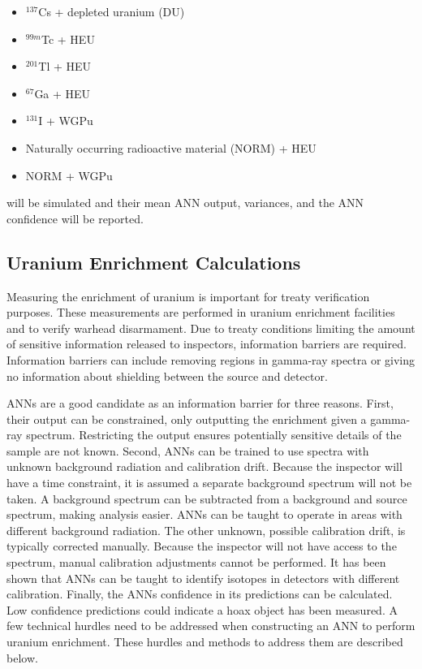 \documentclass[tocnosub,noragright,centerchapter,12pt,fullpage]{uiucecethesis09}
\begin{document}
\begin{itemize}
  \item $^{137}$Cs + depleted uranium (DU)
  \item $^{99m}$Tc + HEU
  \item $^{201}$Tl + HEU
  \item $^{67}$Ga + HEU
  \item $^{131}$I + WGPu
  \item Naturally occurring radioactive material (NORM) + HEU
  \item NORM + WGPu
\end{itemize}

will be simulated and their mean ANN output, variances, and the ANN confidence will be reported. 




\subsection{Uranium Enrichment Calculations}

Measuring the enrichment of uranium is important for treaty verification purposes. These measurements are performed in uranium enrichment facilities and to verify warhead disarmament. Due to treaty conditions limiting the amount of sensitive information released to inspectors, information barriers are required. Information barriers can include removing regions in gamma-ray spectra or giving no information about shielding between the source and detector. 

ANNs are a good candidate as an information barrier for three reasons. First, their output can be constrained, only outputting the enrichment given a gamma-ray spectrum. Restricting the output ensures potentially sensitive details of the sample are not known. Second, ANNs can be trained to use spectra with unknown background radiation and calibration drift. Because the inspector will have a time constraint, it is assumed a separate background spectrum will not be taken. A background spectrum can be subtracted from a background and source spectrum, making analysis easier. ANNs can be taught to operate in areas with different background radiation. The other unknown, possible calibration drift, is typically corrected manually. Because the inspector will not have access to the spectrum, manual calibration adjustments cannot be performed. It has been shown that ANNs can be taught to identify isotopes in detectors with different calibration. Finally, the ANNs confidence in its predictions can be calculated. Low confidence predictions could indicate a hoax object has been measured. A few technical hurdles need to be addressed when constructing an ANN to perform uranium enrichment. These hurdles and methods to address them are described below.
\end{document}
